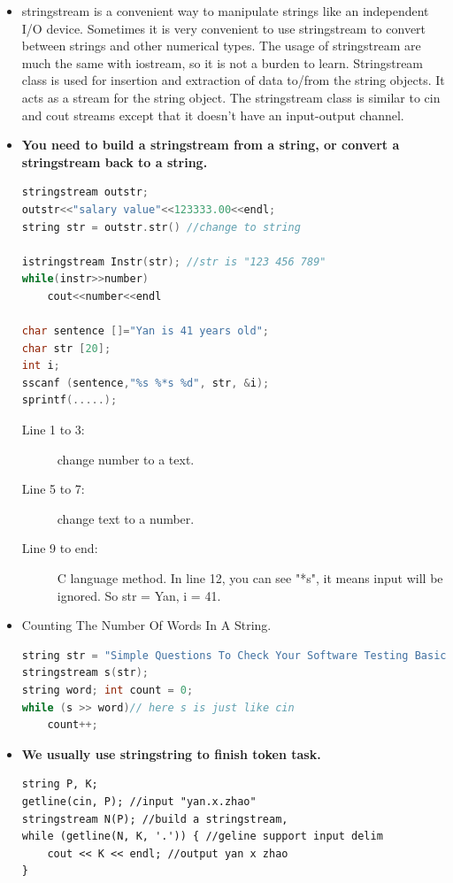 \documentclass[a4paper,11pt,twoside]{book}
\begin{document}
\begin{itemize}
	
	\item stringstream is a convenient way to manipulate strings like an independent I/O device. Sometimes it is very convenient to use stringstream to convert between strings and other numerical types. The usage of stringstream are much the same with iostream, so it is not a burden to learn.  Stringstream class is used for insertion and extraction of data to/from the string objects. It acts as a stream for the string object. The stringstream class is similar to cin and cout streams except that it doesn’t have an input-output channel.
	
	
	\item \textbf{You need to build a stringstream from a string, or convert a stringstream back to a string.}
	
\begin{lstlisting}[frame=single, language=c++]
stringstream outstr;
outstr<<"salary value"<<123333.00<<endl;
string str = outstr.str() //change to string
	
istringstream Instr(str); //str is "123 456 789"
while(instr>>number)
	cout<<number<<endl
	
char sentence []="Yan is 41 years old";
char str [20];
int i;
sscanf (sentence,"%s %*s %d", str, &i);
sprintf(.....);
\end{lstlisting}
\begin{description}
	\item[Line 1 to 3:] change number to a text.
	\item[Line 5 to 7:] change text to a number.
	\item[Line 9 to end:] C language method. In line 12, you can see "*s", it means input will be ignored. So str = Yan, i = 41.
\end{description}

\item Counting The Number Of Words In A String.
\begin{lstlisting}[frame=single, language=c++]
string str = "Simple Questions To Check Your Software Testing Basic Knowledge"; 
stringstream s(str);  
string word; int count = 0;
while (s >> word)// here s is just like cin 
	count++;
\end{lstlisting}

\item \textbf{We usually use stringstring to finish token task.}
\begin{lstlisting}[]
string P, K;
getline(cin, P); //input "yan.x.zhao"
stringstream N(P); //build a stringstream,
while (getline(N, K, '.')) { //geline support input delim
    cout << K << endl; //output yan x zhao
}
\end{lstlisting}
\end{itemize}
\end{document}
